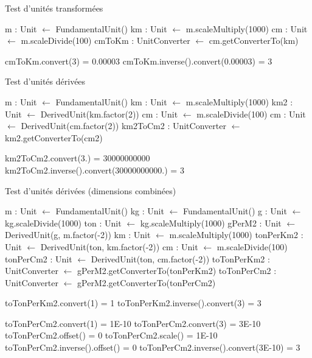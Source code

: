 \documentclass[a4paper,twoside,10pt]{article}
\begin{document}
\begin{algorithm}[!h]
\caption{Test d'unités transformées}\label{transformedTest}
\begin{algorithmic}

\State m : Unit $\gets$ FundamentalUnit()
\State km : Unit $\gets$ m.scaleMultiply(1000)
\State cm : Unit $\gets$ m.scaleDivide(100)
\State cmToKm : UnitConverter $\gets$ cm.getConverterTo(km)

\Require cmToKm.convert(3) = 0.00003
\Require cmToKm.inverse().convert(0.00003) = 3
\EndProcedure
\end{algorithmic}
\end{algorithm}

\begin{algorithm}[!h]
\caption{Test d'unités dérivées}\label{derivedTest}
\begin{algorithmic}

\State m : Unit $\gets$ FundamentalUnit()
\State km : Unit $\gets$ m.scaleMultiply(1000)
\State km2 : Unit $\gets$ DerivedUnit(km.factor(2))
\State cm : Unit $\gets$ m.scaleDivide(100)
\State cm : Unit $\gets$ DerivedUnit(cm.factor(2))
\State km2ToCm2 : UnitConverter $\gets$ km2.getConverterTo(cm2)

\Require km2ToCm2.convert(3.) = 30000000000
\Require km2ToCm2.inverse().convert(30000000000.) = 3
\EndProcedure
\end{algorithmic}
\end{algorithm}

\begin{algorithm}[!h]
\caption{Test d'unités dérivées (dimensions combinées)}\label{combinedDerivedTest}
\begin{algorithmic}

\State m : Unit $\gets$ FundamentalUnit()
\State kg : Unit $\gets$ FundamentalUnit()
\State g : Unit $\gets$ kg.scaleDivide(1000)
\State ton : Unit $\gets$ kg.scaleMultiply(1000)
\State gPerM2 : Unit $\gets$ DerivedUnit(g, m.factor(-2))
\State km : Unit $\gets$ m.scaleMultiply(1000)
\State tonPerKm2 : Unit $\gets$ DerivedUnit(ton, km.factor(-2))
\State cm : Unit $\gets$ m.scaleDivide(100)
\State tonPerCm2 : Unit $\gets$ DerivedUnit(ton, cm.factor(-2))
\State toTonPerKm2 : UnitConverter $\gets$ gPerM2.getConverterTo(tonPerKm2)
\State toTonPerCm2 : UnitConverter $\gets$ gPerM2.getConverterTo(tonPerCm2)

\Require toTonPerKm2.convert(1) = 1
\Require toTonPerKm2.inverse().convert(3) = 3

\Require toTonPerCm2.convert(1) = 1E-10
\Require toTonPerCm2.convert(3) = 3E-10
\Require toTonPerCm2.offset() = 0
\Require toTonPerCm2.scale() = 1E-10
\Require toTonPerCm2.inverse().offset() = 0
\Require toTonPerCm2.inverse().convert(3E-10) = 3
\EndProcedure
\end{algorithmic}
\end{algorithm}
\end{document}
